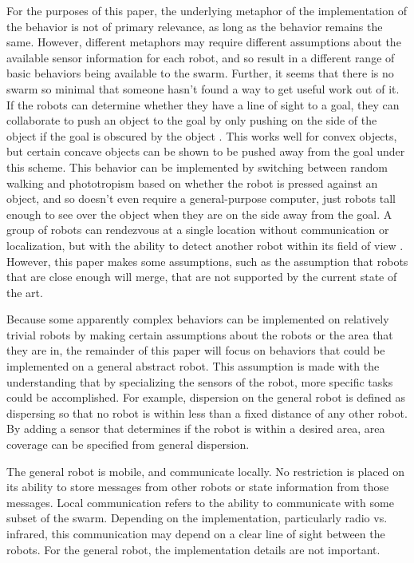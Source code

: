 \documentclass[]{article}
\begin{document}
For the purposes of this paper, the underlying metaphor of the implementation of the behavior is not of primary relevance, as long as the behavior remains the same. 
However, different metaphors may require different assumptions about the available sensor information for each robot, and so result in a different range of basic behaviors being available to the swarm. 
Further, it seems that there is no swarm so minimal that someone hasn't found a way to get useful work out of it.  
If the robots can determine whether they have a line of sight to a goal, they can collaborate to push an object to the goal by only pushing on the side of the object if the goal is obscured by the object \cite{chen2015occlusion}. This works well for convex objects, but certain concave objects can be shown to be pushed away from the goal under this scheme. 
This behavior can be implemented by switching between random walking and phototropism based on whether the robot is pressed against an object, and so doesn't even require a general-purpose computer, just robots tall enough to see over the object when they are on the side away from the goal. 
A group of robots can rendezvous at a single location without communication or localization, but with the ability to detect another robot within its field of view \cite{yu2012rendezvous}. However, this paper makes some assumptions, such as the assumption that robots that are close enough will merge, that are not supported by the current state of the art. 

Because some apparently complex behaviors can be implemented on relatively trivial robots by making certain assumptions about the robots or the area that they are in, the remainder of this paper will focus on behaviors that could be implemented on a general abstract robot. 
This assumption is made with the understanding that by specializing the sensors of the robot, more specific tasks could be accomplished. 
For example, dispersion on the general robot is defined as dispersing so that no robot is within less than a fixed distance of any other robot. 
By adding a sensor that determines if the robot is within a desired area, area coverage can be specified from general dispersion. 
 
The general robot is mobile, and communicate locally. 
No restriction is placed on its ability to store messages from other robots or state information from those messages. 
Local communication refers to the ability to communicate with some subset of the swarm.
Depending on the implementation, particularly radio vs. infrared, this communication may depend on a clear line of sight between the robots.
For the general robot, the implementation details are not important. 
\end{document}

